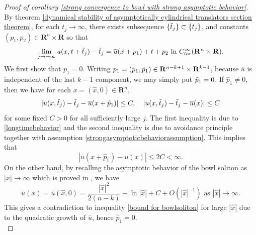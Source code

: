 \documentclass[pdflatex,sn-mathphys-num]{sn-jnl}%
\begin{document}
\begin{proof}[Proof of corollary \ref{strong convergence to bowl with strong asymptotic behavior}]
By theorem \ref{dynamical stability of asymptotically cylindrical translators section theorem}, for each $t_j \to \infty$, there exists subsequence $\{\Tilde{t}_j\} \subset\{t_j\}$, and constants $(p_1, p_2) \in \mathbf{R}^n \times \mathbf{R}$ so that
\begin{equation}\label{longtimebehavior}
    \lim_{j \to +\infty}u(x,t + \Tilde{t}_j) - \Tilde{t}_j = \overline{u}(x+p_1) + t+p_2 \text{ in }C^{\infty}_{loc}(\mathbf{R}^n\times \mathbf{R}).
\end{equation}
We first show that $p_1 = 0$. Writing $p_1 = (\hat{p}_1, \Tilde{p}_1) \in \mathbf{R}^{n-k+1}\times \mathbf{R}^{k-1}$, because $\overline{u}$ is independent of the last $k-1$ component, we may simply put $\Tilde{p}_1 = 0$. If $\hat{p}_1 \neq 0$, then we have for each $x = (\hat{x}, 0) \in \mathbf{R}^n$, 
\begin{equation}
    |u(x,\Tilde{t}_j ) - \Tilde{t}_j - \overline{u}(x + \hat{p}_1)| \leq C , \ \ \ |u(x,\Tilde{t}_j) - \Tilde{t}_j - \overline{u}(x)| \leq C
\end{equation}
for some fixed $C > 0$ for all sufficiently large $j$. The first inequality is due to \eqref{longtimebehavior} and the second inequality is due to avoidance principle together with assumption \eqref{strongasymptoticbehaviorassumption}. This implies that 
\begin{equation}\label{bound for bowlsoliton}
    |\overline{u}(x + \hat{p}_1) - \overline{u}(x)| \leq 2C < \infty.
\end{equation}
On the other hand, by recalling the asymptotic behavior of the bowl soliton as $|x| \to \infty$ which is proved in \cite{bowlstability}, we have
\begin{equation}\label{asymptotic behavior of bowl}
    \overline{u}(x) = \overline{u}(\hat{x}, 0)= \frac{|\hat{x}|^2}{2(n-k)} - \ln |\hat{x}| + C + O(|\hat{x}|^{-1}) \text{ as }|\hat{x}| \to \infty.
\end{equation}
This gives a contradiction to inequality \eqref{bound for bowlsoliton} for large $|\hat{x}|$ due to the quadratic growth of $\overline{u}$, hence $\hat{p}_1 = 0$.\\


\end{proof}
\end{document}
